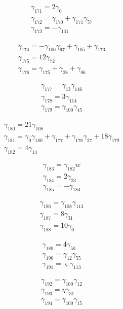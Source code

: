 \[\begin{aligned}\gamma_{171}=2 \gamma_{0}\\ \gamma_{172}=\gamma_{170} + \gamma_{171} \gamma_{57}\\ \gamma_{173}=- \gamma_{131}\end{aligned}\]

\[\begin{aligned}\gamma_{174}=- \gamma_{100} \gamma_{97} + \gamma_{105} + \gamma_{173}\\ \gamma_{175}=12 \gamma_{72}\\ \gamma_{176}=\gamma_{175} + \gamma_{28} + \gamma_{86}\end{aligned}\]

\[\begin{aligned}\gamma_{177}=\gamma_{13} \gamma_{146}\\ \gamma_{178}=3 \gamma_{114}\\ \gamma_{179}=\gamma_{100} \gamma_{45}\end{aligned}\]

\[\begin{aligned}\gamma_{180}=21 \gamma_{108}\\ \gamma_{181}=\gamma_{0} \gamma_{180} + \gamma_{177} + \gamma_{178} \gamma_{27} + 18 \gamma_{179}\\ \gamma_{182}=4 \gamma_{14}\end{aligned}\]

\[\begin{aligned}\gamma_{183}=\gamma_{182} w\\ \gamma_{184}=2 \gamma_{23}\\ \gamma_{185}=- \gamma_{184}\end{aligned}\]

\[\begin{aligned}\gamma_{186}=\gamma_{108} \gamma_{113}\\ \gamma_{187}=8 \gamma_{31}\\ \gamma_{188}=10 \gamma_{0}\end{aligned}\]

\[\begin{aligned}\gamma_{189}=4 \gamma_{50}\\ \gamma_{190}=\gamma_{12} \gamma_{55}\\ \gamma_{191}=\varsigma  \gamma_{113}\end{aligned}\]

\[\begin{aligned}\gamma_{192}=\gamma_{100} \gamma_{12}\\ \gamma_{193}=\eta  \gamma_{31}\\ \gamma_{194}=\gamma_{100} \gamma_{15}\end{aligned}\]

